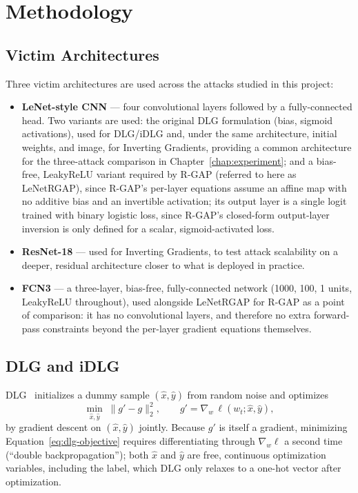 \chapter{Methodology}
\label{chap:methodology}

\section{Victim Architectures}
\label{sec:architectures}

Three victim architectures are used across the attacks studied in this
project:

\begin{itemize}[leftmargin=1.6em]
\setlength{\emergencystretch}{2em}
  \item \textbf{LeNet-style CNN} --- four convolutional layers followed by a
  fully-connected head. Two variants are used: the original DLG
  formulation (bias, sigmoid activations), used for DLG/iDLG and, under
  the same architecture, initial weights, and image, for Inverting
  Gradients, providing a common architecture for the three-attack
  comparison in Chapter~\ref{chap:experiment}; and a bias-free, LeakyReLU variant
  required by R-GAP (referred to here as LeNetRGAP), since R-GAP's
  per-layer equations assume an affine map with no
  additive bias and an invertible activation; its output layer is a single
  logit trained with binary logistic loss, since R-GAP's closed-form
  output-layer inversion is only defined for a scalar, sigmoid-activated
  loss.
  \item \textbf{ResNet-18} --- used for Inverting Gradients, to test attack
  scalability on a deeper, residual architecture closer to what is
  deployed in practice.
  \item \textbf{FCN3} --- a three-layer, bias-free, fully-connected network
  (1000, 100, 1 units, LeakyReLU throughout), used alongside LeNetRGAP for
  R-GAP as a point of comparison: it has no
  convolutional layers, and therefore no extra forward-pass constraints
  beyond the per-layer gradient equations themselves.
\end{itemize}

\section{DLG and iDLG}
\label{sec:dlg}

DLG~\cite{zhu2019dlg} initializes a dummy sample $(\hat{x}, \hat{y})$ from
random noise and optimizes
\begin{equation}
\min_{\hat{x}, \hat{y}} \; \big\lVert g' - g \big\rVert_2^2,
\qquad g' = \nabla_w \, \ell(w_t; \hat{x}, \hat{y}),
\label{eq:dlg-objective}
\end{equation}
by gradient descent on $(\hat{x}, \hat{y})$ jointly. Because $g'$ is itself
a gradient, minimizing Equation~\eqref{eq:dlg-objective} requires
differentiating through $\nabla_w \ell$ a second time (``double
backpropagation''); both $\hat{x}$ and $\hat{y}$ are free, continuous
optimization variables, including the label, which DLG only relaxes to a
one-hot vector after optimization.

